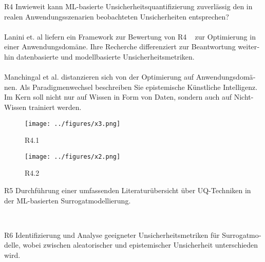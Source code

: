 \begin{otherlanguage}{ngerman}
R4 Inwieweit kann ML-basierte Unsicherheitsquantifizierung zuverlässig den in realen Anwendungsszenarien beobachteten Unsicherheiten entsprechen?
\\
\\
Lanini et. al liefern ein Framework zur Bewertung von R4 ~\parencite{Lanini2024} zur Optimierung in einer Anwendungsdomäne. Ihre Recherche differenziert zur Beantwortung weiterhin datenbasierte und modellbasierte Unsicherheitsmetriken. 
\\
\\
Manchingal et al. distanzieren sich von der Optimierung auf Anwendungsdomänen. Als Paradigmenwechsel beschreiben Sie epistemische Künstliche Intelligenz. Im Kern soll nicht nur auf Wissen in Form von Daten, sondern auch auf Nicht-Wissen trainiert werden. \parencite{manchingal2025}

\begin{figure}[h]
  \centering
  \texttt{[image: ../figures/x3.png]}
  \caption{R4.1}
\end{figure}

\begin{figure}[h]
  \centering
  \texttt{[image: ../figures/x2.png]}
  \caption{R4.2}
\end{figure}



R5 Durchführung einer umfassenden Literaturübersicht über UQ-Techniken in der ML-basierten Surrogatmodellierung.

\parencite{Ulmer2023}

~\nocite{Gawlikowski2023}

\newpage


R6 Identifizierung und Analyse geeigneter Unsicherheitsmetriken für Surrogatmodelle, wobei zwischen aleatorischer und epistemischer Unsicherheit unterschieden wird.


\end{otherlanguage}
